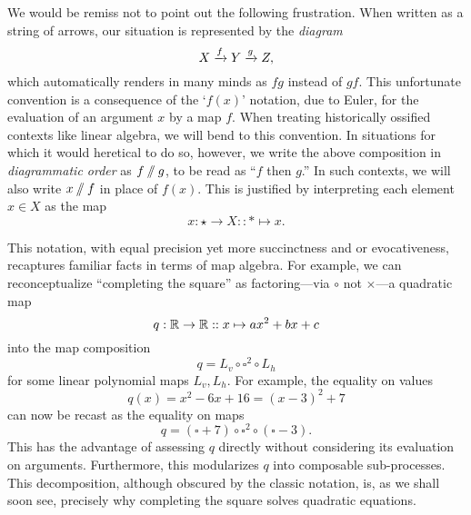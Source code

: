 We would be remiss not to point out the following frustration. When written as a string of arrows, our situation is represented by the \emph{diagram}\[X\xrightarrow{f}Y\xrightarrow{g}Z,\]
which automatically renders in many minds as $fg$ instead of $gf$. This unfortunate convention is a consequence of the `$f(x)$' notation, due to Euler, for the evaluation of an argument $x$ by a map $f$. When treating historically ossified contexts like linear algebra, we will bend to this convention. In situations for which it would heretical to do so, however, we write the above composition in \emph{diagrammatic order} as $f\sslash g$, to be read as ``$f$ then $g$.'' In such contexts, we will also write $x\sslash f$ in place of $f(x)$. This is justified by interpreting each element $x\in X$ as the map 
\[x:\star\to X::*\mapsto x.\]

This notation, with equal precision yet more succinctness and or evocativeness, recaptures familiar facts in terms of map algebra. For example, we can reconceptualize ``completing the square'' as factoring---via $\circ$ not $\times$---a quadratic map \[q:\mathbb R\to\mathbb R::x\mapsto ax^2+bx+c\] into the map composition \[q = L_v\circ \square^2 \circ L_h\] for some linear polynomial maps $L_v, L_h$. For example, the equality on values \[q(x)=x^2-6x+16=(x-3)^2+7\] can now be recast as the equality on maps
\[q = (\square+7)\circ\square^2\circ(\square -3).\]
This has the advantage of assessing $q$ directly without considering its evaluation on arguments. Furthermore, this modularizes $q$ into composable sub-processes. This decomposition, although obscured by the classic notation, is, as we shall soon see, precisely why completing the square solves quadratic equations.

